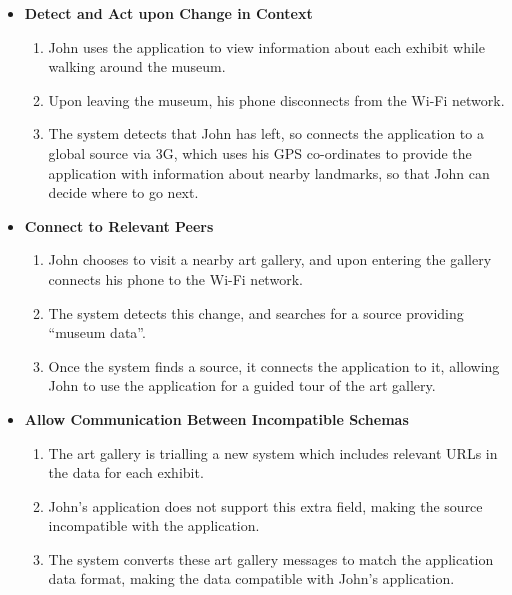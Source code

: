 \documentclass[12pt,twoside,notitlepage]{report}
\begin{document}
\begin{itemize}

\item {\bf Detect and Act upon Change in Context}

\begin{enumerate}

\item John uses the application to view information about each exhibit while walking around the museum.

\item Upon leaving the museum, his phone disconnects from the Wi-Fi network.

\item The system detects that John has left, so connects the application to a global source via 3G, which uses his GPS co-ordinates to provide the application with information about nearby landmarks, so that John can decide where to go next. 

\end{enumerate}

\item {\bf Connect to Relevant Peers}

\begin{enumerate}

\item John chooses to visit a nearby art gallery, and upon entering the gallery connects his phone to the Wi-Fi network.

\item The system detects this change, and searches for a source providing ``museum data''.

\item Once the system finds a source, it connects the application to it, allowing John to use the application for a guided tour of the art gallery. 

\end{enumerate}

\item {\bf Allow Communication Between Incompatible Schemas}

\begin{enumerate}

\item The art gallery is trialling a new system which includes relevant URLs in the data for each exhibit.  

\item John's application does not support this extra field, making the source incompatible with the application.

\item The system converts these art gallery messages to match the application data format, making the data compatible with John's application. 

\end{enumerate}

\end{itemize}
\end{document}
